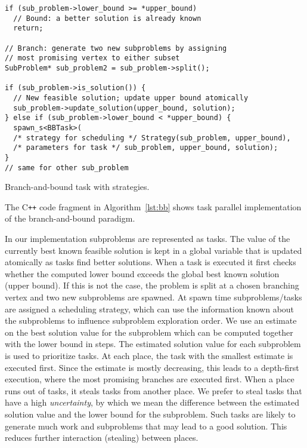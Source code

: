 \documentclass[a4paper,11pt]{article}
\begin{document}
\begin{algorithm}
\begin{lstlisting}[mathescape=true,columns=flexible,escapechar=!]
if (sub_problem->lower_bound >= *upper_bound)
  // Bound: a better solution is already known
  return;

// Branch: generate two new subproblems by assigning
// most promising vertex to either subset
SubProblem* sub_problem2 = sub_problem->split();

if (sub_problem->is_solution()) {
  // New feasible solution; update upper bound atomically
  sub_problem->update_solution(upper_bound, solution);
} else if (sub_problem->lower_bound < *upper_bound) {
  spawn_s<BBTask>(
  /* strategy for scheduling */ Strategy(sub_problem, upper_bound),
  /* parameters for task */ sub_problem, upper_bound, solution);
}
// same for other sub_problem
\end{lstlisting}
\caption{Branch-and-bound task with strategies.}
\label{lst:bb}
\end{algorithm}

The C\verb!++! code fragment in Algorithm~\ref{lst:bb} shows task
parallel implementation of the branch-and-bound paradigm.

In our implementation subproblems are represented as tasks. The value
of the currently best known feasible solution is kept in a global
variable that is updated atomically as tasks find better
solutions. When a task is executed it first checks whether the
computed lower bound exceeds the global best known solution (upper
bound). If this is not the case, the problem is split at a chosen
branching vertex and two new subproblems are spawned. At spawn time
subproblems/tasks are assigned a scheduling strategy, which can use
the information known about the subproblems to influence subproblem
exploration order. We use an estimate on the best solution value for
the subproblem which can be computed together with the lower bound in
 steps.  The estimated solution value for each subproblem is
used to prioritize tasks. At each place, the task with the smallest
estimate is executed first.  Since the estimate is mostly decreasing,
this leads to a depth-first execution, where the most promising
branches are executed first.  When a place runs out of tasks, it
steals tasks from another place. We prefer to steal tasks that have a
high \emph{uncertainty}, by which we mean the difference between the
estimated solution value and the lower bound for the subproblem. Such
tasks are likely to generate much work and subproblems
that may lead to a good solution. This reduces further interaction
(stealing) between places.
\end{document}
